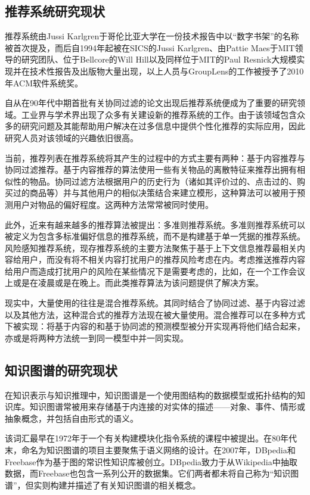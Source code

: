 \documentclass{bjfuthesis}
\begin{document}
\subsection{推荐系统研究现状}
推荐系统由Jussi Karlgren于哥伦比亚大学在一份技术报告中以“数字书架”的名称被首次提及，而后自1994年起被在SICS的Jussi Karlgren、由Pattie Maes于MIT领导的研究团队、位于Bellcore的Will Hill以及同样位于MIT的Paul Resnick大规模实现并在技术性报告及出版物大量出现，以上人员与GroupLens的工作被授予了2010年ACM软件系统奖。

自从在90年代中期首批有关协同过滤的论文出现后推荐系统便成为了重要的研究领域。工业界与学术界出现了众多有关建设新的推荐系统的工作。由于该领域包含众多的研究问题及其能帮助用户解决在过多信息中提供个性化推荐的实际应用，因此研究人员对该领域的兴趣依旧很高。

当前，推荐列表在推荐系统将其产生的过程中的方式主要有两种：基于内容推荐与协同过滤推荐\cite{jafarkarimi2012naive}。基于内容推荐的算法使用一些有关物品的离散特征来推荐出拥有相似性的物品。协同过滤方法根据用户的历史行为（诸如其评价过的、点击过的、购买过的商品等）并与其他用户的相似决策结合来建立模形，这种算法可以被用于预测用户对物品的偏好程度。这两种方法常常被同时使用。

此外，近来有越来越多的推荐算法被提出：多准则推荐系统。多准则推荐系统可以被定义为包含多标准偏好信息的推荐系统，而不是构建基于单一凭据的推荐系统。风险感知推荐系统，现存推荐系统的主要方法聚焦于基于上下文信息推荐最相关内容给用户，而没有将不相关内容打扰用户的推荐风险考虑在内。考虑推送推荐内容给用户而造成打扰用户的风险在某些情况下是需要考虑的，比如，在一个工作会议上或是在凌晨或是在晚上。而此类推荐算法为该问题提供了解决方案。

现实中，大量使用的往往是混合推荐系统。其同时结合了协同过滤、基于内容过滤以及其他方法，这种混合式的推荐方法现在被大量使用。混合推荐可以在多种方式下被实现：将基于内容的和基于协同滤的预测模型被分开实现再将他们结合起来，亦或是将两种方法统一到同一模型中并一同实现。
\subsection{知识图谱的研究现状}
在知识表示与知识推理中，知识图谱是一个使用图结构的数据模型或拓扑结构的知识库。知识图谱常被用来存储基于内连接的对实体的描述——对象、事件、情形或抽象概念，并包括自由形式的语义。

该词汇最早在1972年于一个有关构建模块化指令系统的课程中被提出。在80年代末，命名为知识图谱的项目主要聚焦于语义网络的设计。在2007年，DBpedia和Freebase作为基于图的常识性知识库被创立。DBpedia致力于从Wikipedia中抽取数据，而Freebase也包含一系列公开的数据集。它们两者都未将自己称为“知识图谱”，但实则构建并描述了有关知识图谱的相关概念。
\end{document}
